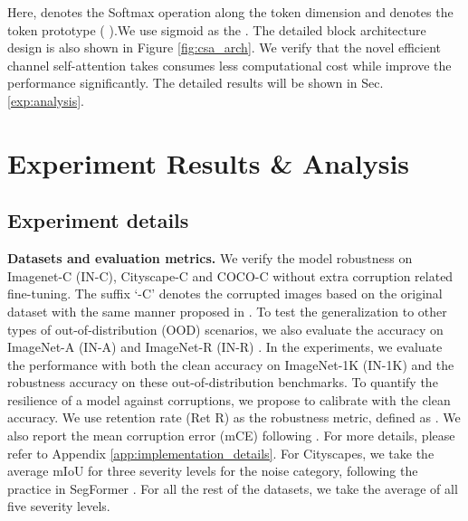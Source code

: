 \documentclass[nohyperref]{article}
\theoremstyle{plain}
\theoremstyle{definition}
\theoremstyle{remark}
\begin{document}
Here,  denotes the Softmax operation along the token dimension and  denotes the token prototype (  ).We use sigmoid as the . The detailed block architecture design is also shown in Figure \ref{fig:csa_arch}.  We verify that the novel efficient channel self-attention takes consumes less computational cost while improve the performance significantly. The detailed results will be shown in Sec. \ref{exp:analysis}.
 \section{Experiment Results \& Analysis}

\subsection{Experiment details}


\textbf{Datasets and evaluation metrics.}  We verify the model robustness on Imagenet-C (IN-C), Cityscape-C and COCO-C without extra corruption related fine-tuning. The suffix `-C' denotes the corrupted images based on the original dataset with the same manner proposed in \cite{hendrycks2019benchmarking}. To test the generalization to other types of out-of-distribution (OOD) scenarios, we also evaluate the accuracy on ImageNet-A \cite{hendrycks2021natural} (IN-A) and ImageNet-R (IN-R) \cite{hendrycks2019benchmarking}. In the experiments, we evaluate the performance with both the clean accuracy on ImageNet-1K (IN-1K) and the robustness accuracy on these out-of-distribution benchmarks. To quantify the resilience of a model against corruptions, we propose to calibrate with the clean accuracy. We use retention rate (Ret R) as the robustness metric, defined as  . We also report the mean corruption error (mCE) following \cite{hendrycks2019benchmarking}. For more details, please refer to Appendix \ref{app:implementation_details}. For Cityscapes, we take the average mIoU for three severity levels for the noise category, following the practice in SegFormer \cite{xie2021segformer}. For all the rest of the datasets, we take the average of all five severity levels.
\end{document}
